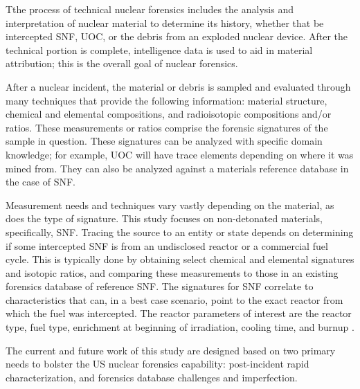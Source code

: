 Tthe process of technical nuclear forensics includes the analysis and
interpretation of nuclear material to determine its history, whether that be
intercepted \gls{SNF}, \gls{UOC}, or the debris from an exploded nuclear
device. After the technical portion is complete, intelligence data is used
to aid in material attribution; this is the overall goal of nuclear forensics. 

After a nuclear incident, the material or debris is sampled and evaluated
through many techniques that provide the following information: material
structure, chemical and elemental compositions, and radioisotopic compositions
and/or ratios.  These measurements or ratios comprise the forensic signatures
of the sample in question. These signatures can be analyzed with specific
domain knowledge; for example, \gls{UOC} will have trace elements depending on
where it was mined from.  They can also be analyzed against a materials
reference database in the case of \gls{SNF}.

Measurement needs and techniques vary vastly depending on the material, as does
the type of signature. This study focuses on non-detonated materials,
specifically, \gls{SNF}. Tracing the source to an entity or state depends on
determining if some intercepted \gls{SNF} is from an undisclosed reactor or a
commercial fuel cycle. This is typically done by obtaining select chemical and
elemental signatures and isotopic ratios, and comparing these measurements to
those in an existing forensics database of reference \gls{SNF}.  The signatures
for \gls{SNF} correlate to characteristics that can, in a best case scenario,
point to the exact reactor from which the fuel was intercepted.  The reactor
parameters of interest are the reactor type, fuel type, enrichment at beginning
of irradiation, cooling time, and burnup \cite{weber_2006, weber_2010,
weber_2011}.

The current and future work of this study are designed based on two primary
needs to bolster the \gls{US} nuclear forensics capability: post-incident rapid
characterization, and forensics database challenges and imperfection.  

